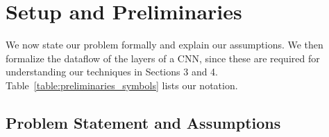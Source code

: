 
\section{Setup and Preliminaries}\label{sec:preliminaries}
We now state our problem formally and explain our assumptions.
We then formalize the dataflow of the layers of a CNN, since these are required for understanding our techniques in Sections 3 and 4.
Table~\ref{table:preliminaries_symbols} lists our notation.

\vspace{-2mm}
\subsection{Problem Statement and Assumptions}\label{sec:problem}

